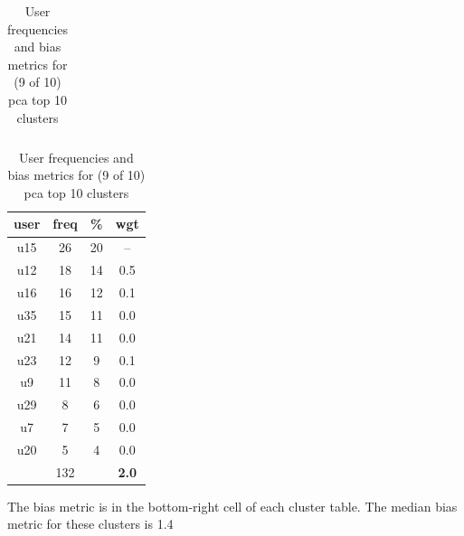 \begin{table}
\begin{tabular}{ |c|c|c|c| }
	\hline
\end{tabular}
\begin{tabular}{ |c|c|c|c| }
	\hline
	\textbf{user} & \textbf{freq} & \textbf{\%} & \textbf{wgt} \\
	\hline
	u15 & 26 & 20 & -- \\
	u12 & 18 & 14 & 0.5 \\
	u16 & 16 & 12 & 0.1 \\
	u35 & 15 & 11 & 0.0 \\
	u21 & 14 & 11 & 0.0 \\
	u23 & 12 & 9 & 0.1 \\
	u9 & 11 & 8 & 0.0 \\
	u29 & 8 & 6 & 0.0 \\
	u7 & 7 & 5 & 0.0 \\
	u20 & 5 & 4 & 0.0 \\
	 & 132 & & \textbf{2.0} \\
	\hline
\end{tabular}
\caption{User frequencies and bias metrics for (9 of 10) pca top 10 clusters}
{\small The bias metric is in the bottom-right cell of each cluster table. The median bias metric for these clusters is 1.4}
\end{table}

